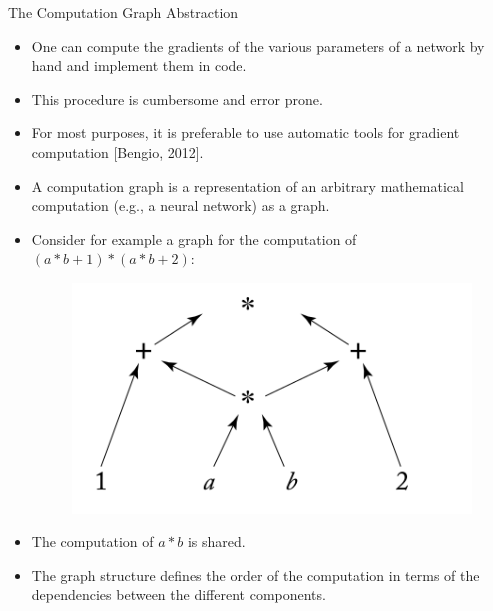 \documentclass[handout]{beamer}
\begin{document}
\begin{frame}{The Computation Graph Abstraction}
\begin{scriptsize}
\begin{itemize}
\item  One can compute the gradients of the various parameters of a network by hand and implement them in code.

\item This procedure is cumbersome and error prone.

\item For most purposes, it is preferable to use automatic tools for gradient computation [Bengio, 2012].

\item A computation graph is a representation of an arbitrary mathematical computation (e.g., a neural network) as a graph.

\item Consider for example a graph for the computation of $(a*b+1)*(a*b+2)$:

\begin{figure}[htb]
	\centering
	 \includegraphics[scale=0.25]{pics/compGraph.png}
\end{figure}

\item The computation of $a*b$ is shared.

\item The graph structure defines the order of the computation in terms of the dependencies between the different components.

\end{itemize}
\end{scriptsize}
\end{frame}
\end{document}
